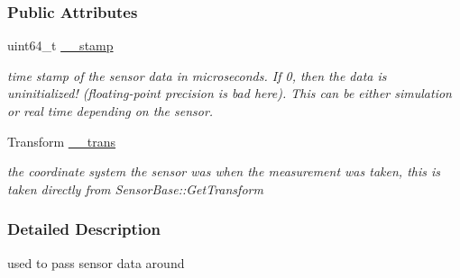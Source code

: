 \subsubsection*{Public Attributes}
\begin{DoxyCompactItemize}
\item 
\hypertarget{classOpenRAVE_1_1SensorBase_1_1SensorData_a0503a26959ec94efdab737ce47842afe}{
uint64\_\-t \hyperlink{classOpenRAVE_1_1SensorBase_1_1SensorData_a0503a26959ec94efdab737ce47842afe}{\_\-\_\-stamp}}
\label{classOpenRAVE_1_1SensorBase_1_1SensorData_a0503a26959ec94efdab737ce47842afe}

\begin{DoxyCompactList}\small\item\em time stamp of the sensor data in microseconds. If 0, then the data is uninitialized! (floating-\/point precision is bad here). This can be either simulation or real time depending on the sensor. \item\end{DoxyCompactList}\item 
\hypertarget{classOpenRAVE_1_1SensorBase_1_1SensorData_a5786ccc78c0aae6ca580507121b3c24a}{
Transform \hyperlink{classOpenRAVE_1_1SensorBase_1_1SensorData_a5786ccc78c0aae6ca580507121b3c24a}{\_\-\_\-trans}}
\label{classOpenRAVE_1_1SensorBase_1_1SensorData_a5786ccc78c0aae6ca580507121b3c24a}

\begin{DoxyCompactList}\small\item\em the coordinate system the sensor was when the measurement was taken, this is taken directly from SensorBase::GetTransform \item\end{DoxyCompactList}\end{DoxyCompactItemize}


\subsubsection{Detailed Description}
used to pass sensor data around 
